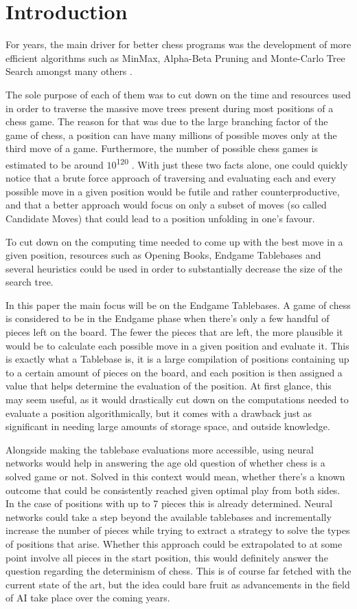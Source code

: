 \newpage
\section{Introduction}
\label{sec:Introduction}
For years, the main driver for better chess programs was the development of more efficient algorithms such as MinMax, Alpha-Beta Pruning and Monte-Carlo Tree Search amongst many others \cite{Klein}. 

The sole purpose of each of them was to cut down on the time and resources used in order to traverse the massive move trees present during most positions of a chess game. The reason for that was due to the large branching factor of the game of chess, a position can have many millions of possible moves only at the third move of a game. Furthermore, the number of possible chess games is estimated to be around $10$\textsuperscript{120} \cite{Shan50}. With just these two facts alone, one could quickly notice that a brute force approach of traversing and evaluating each and every possible move in a given position would be futile and rather counterproductive, and that a better approach would focus on only a subset of moves (so called Candidate Moves) that could lead to a position unfolding in one's favour.

To cut down on the computing time needed to come up with the best move in a given position, resources such as Opening Books, Endgame Tablebases and several heuristics could be used in order to substantially decrease the size of the search tree. 

In this paper the main focus will be on the Endgame Tablebases. A game of chess is considered to be in the Endgame phase when there's only a few handful of pieces left on the board. The fewer the pieces that are left, the more plausible it would be to calculate each possible move in a given position and evaluate it. This is exactly what a Tablebase is, it is a large compilation of positions containing up to a certain amount of pieces on the board, and each position is then assigned a value that helps determine the evaluation of the position. At first glance, this may seem useful, as it would drastically cut down on the computations needed to evaluate a position algorithmically, but it comes with a drawback just as significant in needing large amounts of storage space, and outside knowledge.

Alongside making the tablebase evaluations more accessible, using neural networks would help in answering the age old question of whether chess is a solved game or not. Solved in this context would mean, whether there's a known outcome that could be consistently reached given optimal play from both sides. In the case of positions with up to 7 pieces this is already determined. Neural networks could take a step beyond the available tablebases and incrementally increase the number of pieces while trying to extract a strategy to solve the types of positions that arise. Whether this approach could be extrapolated to at some point involve all pieces in the start position, this would definitely answer the question regarding the determinism of chess. This is of course far fetched with the current state of the art, but the idea could bare fruit as advancements in the field of AI take place over the coming years.

